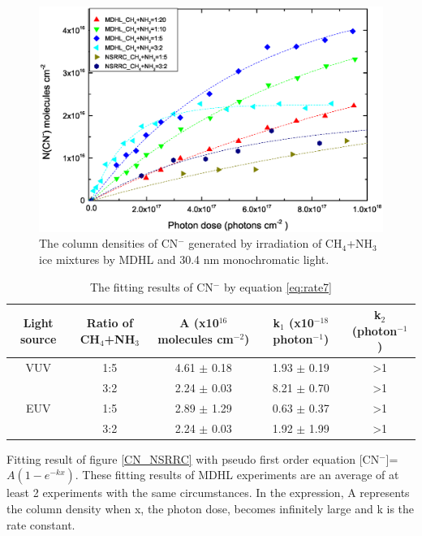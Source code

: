 \begin{figure}
\centering
\includegraphics[width=\textwidth]{figures/chapter3/overall_CN_NSRRC.eps}
\caption{The column densities of CN$^-$ generated by irradiation of CH$_4$+NH$_3$ ice mixtures by MDHL and 30.4 nm monochromatic light.}
\label{fig:CN_NSRRC}
\end{figure}

\begin{table}[htbp]
\caption{The fitting results of CN$^-$ by equation \ref{eq:rate7}}
\label{tab:CNrate}
\begin{tabular}{ccccc}
\hline
\hline
Light source & Ratio of CH$_4$+NH$_3$ & A (x10$^{16}$ molecules cm$^{-2}$) & k$_1$ (x10$^{-18}$ photon$^{-1}$) & k$_2$ (photon$^{-1}$)\\
\hline
VUV & 1:5 & 4.61 $\pm$ 0.18 & 1.93 $\pm$ 0.19 & >1 \\
 & 3:2 & 2.24 $\pm$ 0.03 & 8.21 $\pm$ 0.70 & >1 \\
\hline
EUV & 1:5 & 2.89 $\pm$ 1.29 & 0.63 $\pm$ 0.37 & >1 \\
 & 3:2 & 2.24 $\pm$ 0.03 & 1.92 $\pm$ 1.99 & >1 \\
\hline
\end{tabular}
Fitting result of figure \ref{CN_NSRRC} with pseudo first order equation [CN$^-$]=$A(1-e^{-kx})$. These fitting results of MDHL experiments are an average of at least 2 experiments with the same circumstances. In the expression, A represents the column density when x, the photon dose, becomes infinitely large and k is the rate constant.\
\end{table}


